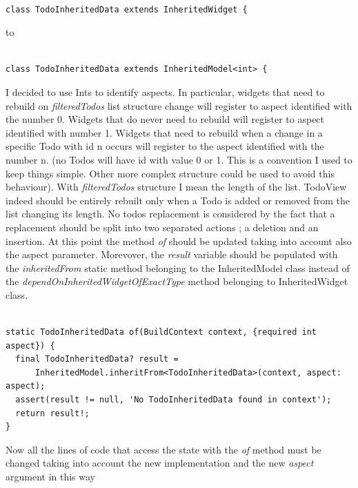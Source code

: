 \begin{verbatim}

class TodoInheritedData extends InheritedWidget {
\end{verbatim}

to
\mbox{}\\


\begin{verbatim}

class TodoInheritedData extends InheritedModel<int> {
\end{verbatim}

I decided to use Ints to identify aspects. In particular, widgets that need to rebuild on \textit{filteredTodos} list structure change will register to aspect identified with the number 0. Widgets that do never need to rebuild will register to aspect identified with number 1. Widgets that need to rebuild when a change in a specific Todo with id n occurs will register to the aspect identified with the number n. (no Todos will have id with value 0 or 1. This is a convention I used to keep things simple. Other more complex structure could be used to avoid this behaviour). With \textit{filteredTodos} structure I mean the length of the list. TodoView indeed should be entirely rebuilt only when a Todo is added or removed from the list changing its length. No todos replacement is considered by the fact that a replacement should be split into two separated actions ; a deletion and an insertion.
At this point the method \textit{of} should be updated taking into account also the aspect parameter. Morevover, the \textit{result} variable should be populated with the \textit{inheritedFrom  }static method belonging to the InheritedModel class instead of the \textit{dependOnInheritedWidgetOfExactType} method belonging to InheritedWidget class.
\mbox{}\\


\begin{verbatim}

static TodoInheritedData of(BuildContext context, {required int aspect}) {
  final TodoInheritedData? result =
      InheritedModel.inheritFrom<TodoInheritedData>(context, aspect: aspect);
  assert(result != null, 'No TodoInheritedData found in context');
  return result!;
}
\end{verbatim}

Now all the lines of code that access the state with the \textit{of} method must be changed taking into account the new implementation and the new \textit{aspect} argument in this way
\mbox{}\\


